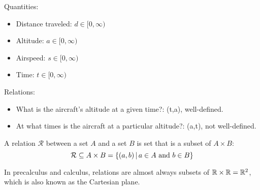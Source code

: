 \documentclass[letterpaper,12pt,fleqn]{article}
\newcommand{\Rel}{\mathcal{R}}
\begin{document}
\begin{example}
  Quantities:

  \begin{itemize}
  \item Distance traveled: \(d\in[0,\infty)\)
  \item Altitude: \(a\in[0,\infty)\)
  \item Airspeed: \(s\in[0,\infty)\)
  \item Time: \(t\in[0,\infty)\)
  \end{itemize}

  Relations:

  \begin{itemize}
  \item What is the aircraft's altitude at a given time?: (t,a), well-defined.
  \item At what times is the aircraft at a particular altitude?: (a,t), not well-defined.
  \end{itemize}

  \begin{center}
  \end{center}
\end{example}

\begin{definition}[Relation]
  A relation \(\Rel\) between a set \(A\) and a set \(B\) is set that is a subset of \(A\times B\):
  \[\Rel\subseteq A\times B=\setb{(a,b)}{a\in A\ \text{and}\ b\in B}\]
\end{definition}

In precalculus and calculus, relations are almost always subsets of \(\mathbb{R}\times\mathbb{R}=\mathbb{R}^2\), which is also known as
the Cartesian plane.
\end{document}
